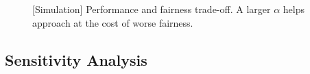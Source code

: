 



\begin{figure}[h]
	\centering
	\hspace{0.05in}
	\caption{[Simulation] Performance and fairness trade-off. A larger $\alpha$ helps \name approach \SRPT at the cost of worse fairness. }
	\label{fig:fairness_alpha}
\end{figure}

\subsection{Sensitivity Analysis}
\label{sec:sensitivity}

